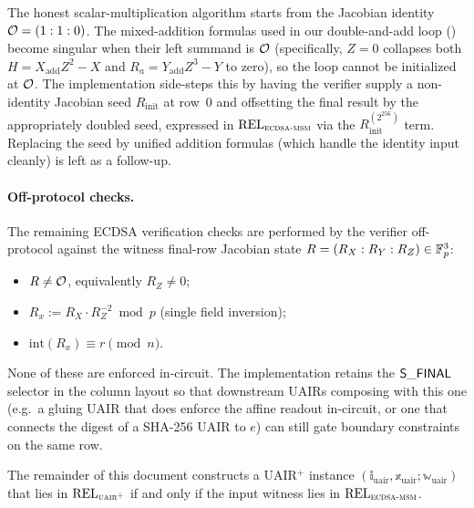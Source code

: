 \begin{remark}\label{rem:r-init}
The honest scalar-multiplication algorithm starts from the Jacobian
identity $\mathcal{O} = (1 : 1 : 0)$. The mixed-addition formulas used in our
double-and-add loop () become singular when their
left summand is $\mathcal{O}$ (specifically, $Z = 0$ collapses both $H = X_{\mathrm{add}} Z^2 - X$
and $R_a = Y_{\mathrm{add}} Z^3 - Y$ to zero), so the loop cannot be
initialized at $\mathcal{O}$. The implementation side-steps this by having
the verifier supply a non-identity Jacobian seed
$R_{\mathrm{init}}$ at row~$0$ and offsetting the final result by the
appropriately doubled seed, expressed in
$\mathrm{REL}_{\textsc{ecdsa-msm}}$ via the $R_{\mathrm{init}}^{(2^{256})}$
term. Replacing the seed by unified addition formulas (which handle the
identity input cleanly) is left as a follow-up.
\end{remark}

\paragraph{Off-protocol checks.}
The remaining ECDSA verification checks are performed by the verifier
off-protocol against the witness final-row Jacobian state
$R = (R_X : R_Y : R_Z) \in \mathbb{F}_p^3$:
\begin{itemize}
\item $R \neq \mathcal{O}$, equivalently $R_Z \neq 0$;
\item $R_x := R_X \cdot R_Z^{-2} \bmod p$ (single field inversion);
\item $\mathrm{int}(R_x) \equiv r \pmod n$.
\end{itemize}
None of these are enforced in-circuit. The implementation retains the
$\mathsf{S\_FINAL}$ selector in the column layout so that downstream
UAIRs composing with this one (e.g.\ a gluing UAIR that does enforce
the affine readout in-circuit, or one that connects the digest of a
SHA-256 UAIR to $e$) can still gate boundary constraints on the same
row.

The remainder of this document constructs a UAIR$^+$ instance
$(\mathbb{i}_{\text{uair}},\mathbb{x}_{\text{uair}};\mathbb{w}_{\text{uair}})$
that lies in $\mathrm{REL}_{\textsc{uair}^+}$ if and only if the
input witness lies in $\mathrm{REL}_{\textsc{ecdsa-msm}}$.
